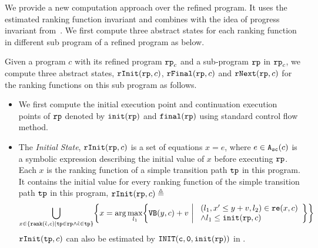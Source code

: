 We provide a new computation approach over the refined program.
It uses the estimated ranking function invariant and combines with the idea of progress invariant from~\cite{GulwaniJK09}.
We first compute three abstract states for each ranking function in different sub program of a refined program as below.
\begin{defn}
  \label{def:alg-absstate}
  Given a program $c$ with its refined program $\mathtt{rp}_c$ and a sub-program $\mathtt{rp}$ in $\mathtt{rp}_c$,
  we compute three abstract states, $\mathtt{rInit}(\mathtt{rp}, c)$, $\mathtt{rFinal}(\mathtt{rp}, c)$ and $\mathtt{rNext}(\mathtt{rp}, c)$  for the ranking functions on this sub program as follows.
 \begin{itemize}
  \item 
  We first compute the initial execution point and continuation execution points of $\mathtt{rp}$ denoted by
  $\mathtt{init}(\mathtt{rp})$
  and 
  $\mathtt{final}(\mathtt{rp})$ using standard control flow method.
  \item The \emph{Initial State}, 
  $\mathtt{rInit}(\mathtt{rp}, c)$ is a set of equations $x = e$, where $e \in {\ensuremath{\mathtt{A_{sc}}}}(c)$ is a
  symbolic expression describing the initial value of $x$ before executing $\mathtt{rp}$.
  Each $x$ is the ranking function of a simple transition path $\mathtt{tp}$ in this program. 
  It contains the initial value for every ranking function of the simple transition path $\mathtt{tp}$ in this program, 
  $\mathtt{rInit}(\mathtt{rp}, c) \triangleq $
  {\small
  \[
   \bigcup_{x \in \left\{ \locbound(\absevent, c) | \tpath \in \rprog \land \absevent \in \tpath \right\} }
   \left \{ 
   x = \arg\max_{l_1}\left\{
     \varinvar(y, c) + v ~\middle\vert~ 
     \begin{array}{l} 
       (l_1, x' \leq y + v, l_2) \in \reset(x, c) 
       \\
     \land l_1 \leq \absinit(\rprog, c)
   \end{array}
   \right\}
   \right\}
   \]
 }
 $\mathtt{rInit}(\mathtt{tp}, c)$ can also be estimated by $\mathtt{INIT(c, 0, \mathtt{init}(\mathtt{rp}))}$ in \cite{GulwaniJK09}. 

\end{itemize}
\end{defn}
